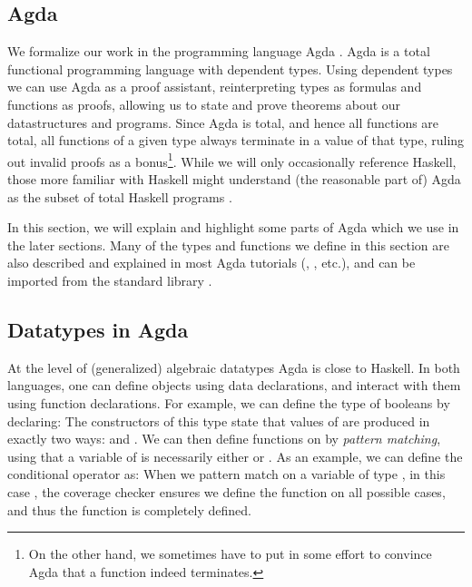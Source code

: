 \subsection{Agda}\label{sec:background-agda}
We formalize our work in the programming language Agda \cite{agda}. Agda is a total functional programming language with dependent types. Using dependent types we can use Agda as a proof assistant, reinterpreting types as formulas and functions as proofs, allowing us to state and prove theorems about our datastructures and programs. Since Agda is total, and hence all functions are total, all functions of a given type always terminate in a value of that type, ruling out invalid proofs as a bonus\footnote{On the other hand, we sometimes have to put in some effort to convince Agda that a function indeed terminates.}. While we will only occasionally reference Haskell, those more familiar with Haskell might understand (the reasonable part of) Agda as the subset of total Haskell programs \cite{agda2hs}.

In this section, we will explain and highlight some parts of Agda which we use in the later sections. Many of the types and functions we define in this section are also described and explained in most Agda tutorials (\cite{ulftutorial}, \cite{plfa}, etc.), and can be imported from the standard library \cite{agdastdlib}.


\subsection{Datatypes in Agda}\label{sec:background-data}
At the level of (generalized) algebraic datatypes Agda is close to Haskell. In both languages, one can define objects using data declarations, and interact with them using function declarations. For example, we can define the type of booleans by declaring:
The constructors of this type state that values of  are produced in exactly two ways:  and . We can then define functions on  by \emph{pattern matching}, using that a variable of  is necessarily either  or . As an example, we can define the conditional operator as:
When we pattern match on a variable of type , in this case , the coverage checker ensures we define the function on all possible cases, and thus the function is completely defined.

